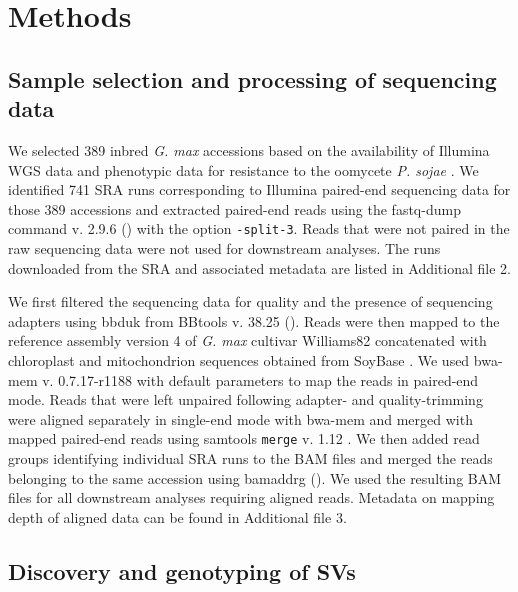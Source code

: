 \section*{Methods}
\label{sv-gwas-methods}

\subsection*{Sample selection and processing of sequencing data}
\label{sv-gwas-sequencing-data}

We selected 389 inbred \emph{G. max} accessions based on the availability of
Illumina WGS data and phenotypic data for resistance to the oomycete \emph{P.
sojae} \citep{deronne2022}.  We identified 741 SRA runs corresponding to
Illumina paired-end sequencing data for those 389 accessions \citep[data from][]{zhou2015, valliyodan2016, fang2017, bayer2021}
and extracted paired-end reads using the fastq-dump command v. 2.9.6
(\citeauthor[][\url{https://github.com/ncbi/sra-tools}]{sratoolkit}) with the
option \texttt{-\-split-3}.
Reads that were not paired in the raw sequencing data were not used
for downstream analyses.  The runs downloaded from the SRA and associated
metadata are listed in Additional file 2.

We first filtered the sequencing data for quality and the presence of sequencing
adapters using bbduk from BBtools v. 38.25
(\citeauthor[][\url{https://sourceforge.net/projects/bbmap/}]{bbtools}). Reads
were then mapped to the reference assembly version 4 of \emph{G. max}
cultivar Williams82 \citep{valliyodan2019} concatenated with chloroplast
and mitochondrion sequences obtained from SoyBase \citep{grant2010}. We used
bwa-mem v. 0.7.17-r1188 \citep{li2009-bwa} with default parameters to map the
reads in paired-end mode. Reads that were left unpaired following adapter- and
quality-trimming were aligned separately in single-end mode with bwa-mem and
merged with mapped paired-end reads using samtools \texttt{merge}
v. 1.12 \citep{li2009-samtools}.  We then added read groups identifying
individual SRA runs to the BAM files and merged the reads belonging to the same
accession using bamaddrg
(\citeauthor[][\url{https://github.com/ekg/bamaddrg}]{bamaddrg}). We used the
resulting BAM files for all downstream analyses requiring aligned reads.
Metadata on mapping depth of aligned data can be found in Additional file 3.

\subsection*{Discovery and genotyping of SVs}
\label{sv-gwas-sv-discovery-genotyping}

